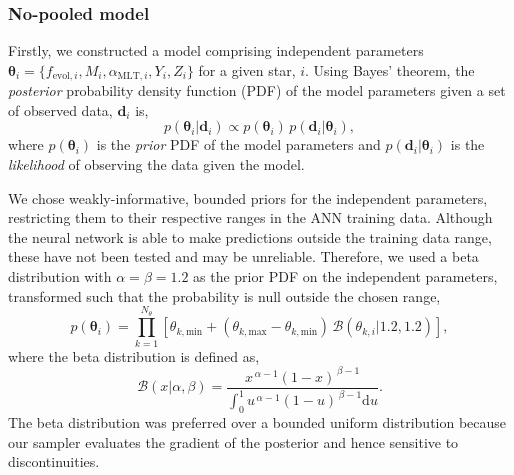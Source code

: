 \documentclass[a4paper,fleqn,usenatbib]{mnras}
\begin{document}
\subsubsection{No-pooled model}\label{sec:np}

Firstly, we constructed a model comprising independent parameters $\boldsymbol{\theta}_i = \{f_{\mathrm{evol}, i}, M_i, \alpha_{\mathrm{MLT},i}, Y_i, Z_i\}$ for a given star, $i$. Using Bayes' theorem, the \emph{posterior} probability density function (PDF) of the model parameters given a set of observed data, $\boldsymbol{d}_i$ is,
%
\begin{equation}
    p(\boldsymbol{\theta}_i | \boldsymbol{d}_i) \propto p(\boldsymbol{\theta}_i) \, p(\boldsymbol{d}_i | \boldsymbol{\theta}_i),
    \label{eq:bayes}
\end{equation}
%
where $p(\boldsymbol{\theta}_i)$ is the \emph{prior} PDF of the model parameters and $p(\boldsymbol{d}_i | \boldsymbol{\theta}_i)$ is the \emph{likelihood} of observing the data given the model.

We chose weakly-informative, bounded priors for the independent parameters, restricting them to their respective ranges in the ANN training data. Although the neural network is able to make predictions outside the training data range, these have not been tested and may be unreliable. Therefore, we used a beta distribution with $\alpha = \beta = 1.2$ as the prior PDF on the independent parameters, transformed such that the probability is null outside the chosen range,
%
\begin{equation}
    p(\boldsymbol{\theta}_i) = \prod_{k=1}^{N_{\theta}} \left[ \theta_{k, \mathrm{min}} + (\theta_{k, \mathrm{max}} - \theta_{k, \mathrm{min}}) \, \mathcal{B}(\theta_{k, i} | 1.2, 1.2)\right],
\end{equation}
%
where the beta distribution is defined as,
%
\begin{equation}
    \mathcal{B}(x | \alpha, \beta) = \frac{x^{\,\alpha-1}(1-x)^{\,\beta-1}}{\int_{0}^{1} u^{\,\alpha-1}(1-u)^{\,\beta-1} \mathrm{d} u}.
\end{equation}
%
The beta distribution was preferred over a bounded uniform distribution because our sampler evaluates the gradient of the posterior and hence sensitive to discontinuities. 
\end{document}
